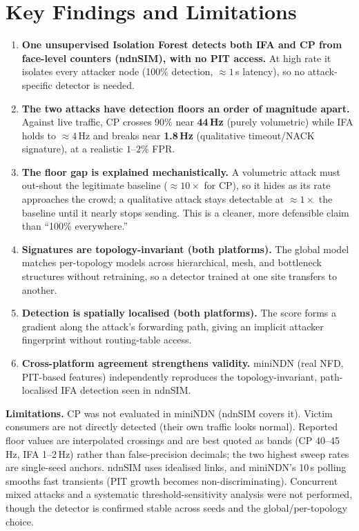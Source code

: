 \documentclass[11pt,a4paper]{article}
\begin{document}
\section{Key Findings and Limitations}

\begin{enumerate}[noitemsep]
  \item \textbf{One unsupervised Isolation Forest detects both IFA and CP from face-level counters (ndnSIM), with no PIT access.} At high rate it isolates every attacker node (100\% detection, $\approx 1$\,s latency), so no attack-specific detector is needed.
  \item \textbf{The two attacks have detection floors an order of magnitude apart.} Against live traffic, CP crosses 90\% near \textbf{44\,Hz} (purely volumetric) while IFA holds to $\approx 4$\,Hz and breaks near \textbf{1.8\,Hz} (qualitative timeout/NACK signature), at a realistic $1$--$2\%$ FPR.
  \item \textbf{The floor gap is explained mechanistically.} A volumetric attack must out-shout the legitimate baseline ($\approx 10\times$ for CP), so it hides as its rate approaches the crowd; a qualitative attack stays detectable at $\approx 1\times$ the baseline until it nearly stops sending. This is a cleaner, more defensible claim than ``100\% everywhere.''
  \item \textbf{Signatures are topology-invariant (both platforms).} The global model matches per-topology models across hierarchical, mesh, and bottleneck structures without retraining, so a detector trained at one site transfers to another.
  \item \textbf{Detection is spatially localised (both platforms).} The score forms a gradient along the attack's forwarding path, giving an implicit attacker fingerprint without routing-table access.
  \item \textbf{Cross-platform agreement strengthens validity.} miniNDN (real NFD, PIT-based features) independently reproduces the topology-invariant, path-localised IFA detection seen in ndnSIM.
\end{enumerate}

\noindent\textbf{Limitations.} CP was not evaluated in miniNDN (ndnSIM covers it). Victim consumers are not directly detected (their own traffic looks normal). Reported floor values are interpolated crossings and are best quoted as bands (CP 40--45\,Hz, IFA 1--2\,Hz) rather than false-precision decimals; the two highest sweep rates are single-seed anchors. ndnSIM uses idealised links, and miniNDN's 10\,s polling smooths fast transients (PIT growth becomes non-discriminating). Concurrent mixed attacks and a systematic threshold-sensitivity analysis were not performed, though the detector is confirmed stable across seeds and the global/per-topology choice.
\end{document}
